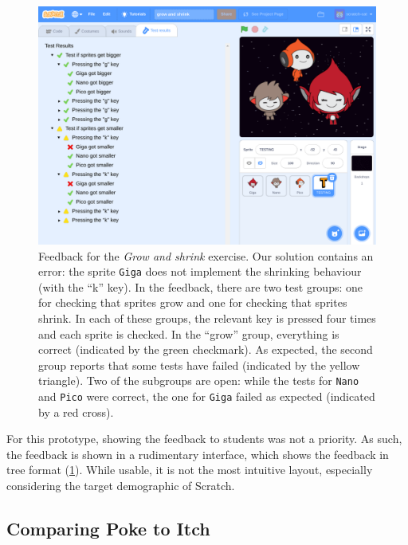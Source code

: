 \documentclass[../main]{subfiles}
\begin{document}
\begin{figure}
    \begin{wide}
        \includegraphics[width=\linewidth]{scratch-poke-feedback}
    \end{wide}
    \caption{
        Feedback for the \emph{Grow and shrink} exercise.
        Our solution contains an error: the sprite \texttt{Giga} does not implement the shrinking behaviour (with the ``k'' key).
        In the feedback, there are two test groups: one for checking that sprites grow and one for checking that sprites shrink.
        In each of these groups, the relevant key is pressed four times and each sprite is checked.
        In the ``grow'' group, everything is correct (indicated by the green checkmark).
        As expected, the second group reports that some tests have failed (indicated by the yellow triangle).
        Two of the subgroups are open: while the tests for \texttt{Nano} and \texttt{Pico} were correct, the one for \texttt{Giga} failed as expected (indicated by a red cross).
    }
    \label{fig:poke-feedback-result}
\end{figure}

For this prototype, showing the feedback to students was not a priority.
As such, the feedback is shown in a rudimentary interface, which shows the feedback in tree format (\cref{fig:poke-feedback-result}).
While usable, it is not the most intuitive layout, especially considering the target demographic of Scratch.

\subsection{Comparing Poke to Itch}\label{subsec:comparing-poke-to-itch}
\end{document}
